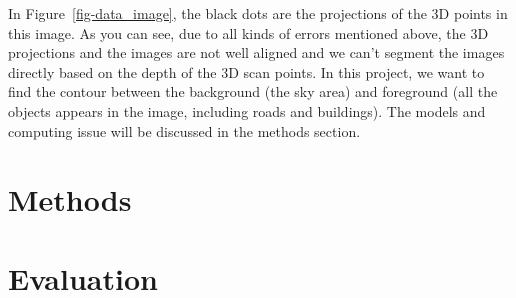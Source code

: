 \documentclass{article} %
\begin{document}
In Figure~\ref{fig-data_image}, the black dots are the projections of
the 3D points in this image. As you can see, due to all kinds of
errors mentioned above, the 3D projections and the images are not well
aligned and we can't segment the images directly based on the depth of
the 3D scan points. In this project, we want to find the contour
between the background (the sky area) and foreground (all the objects
appears in the image, including roads and buildings). The models and
computing issue will be discussed in the methods section.

\section{Methods}

\section{Evaluation}




\end{document}
